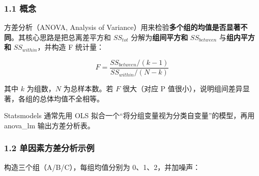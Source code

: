 \subsubsection{1.1 概念}\label{ux6982ux5ff5}

方差分析（ANOVA, Analysis of
Variance）用来检验\textbf{多个组的均值是否显著不同}。其核心思路是把总离差平方和
\(SS_{tot}\) 分解为\textbf{组间平方和} \(SS_{between}\)
与\textbf{组内平方和} \(SS_{within}\)，并构造 F 统计量：

\[
F = \frac{SS_{between}/(k-1)}{SS_{within}/(N-k)}
\]

其中 \(k\) 为组数，\(N\) 为总样本数。若 \(F\) 很大（对应 P
值很小），说明组间差异显著，各组的总体均值不全相等。

Statsmodels 通常先用 OLS
拟合一个``将分组变量视为分类自变量''的模型，再用 anova\_lm
输出方差分析表。

\subsubsection{1.2
单因素方差分析示例}\label{ux5355ux56e0ux7d20ux65b9ux5deeux5206ux6790ux793aux4f8b}

构造三个组（A/B/C），每组均值分别为 0、1、2，并加噪声：

